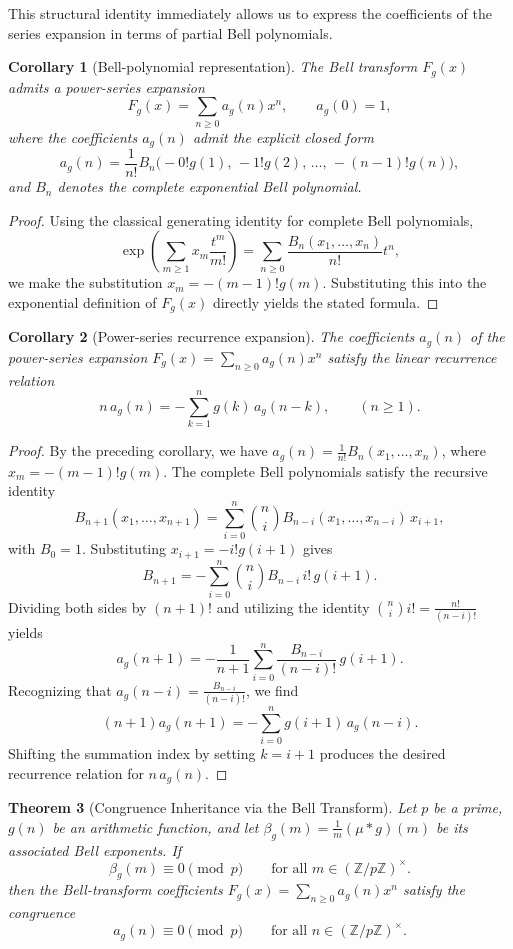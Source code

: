 \documentclass[11pt, a4paper]{article}
\newtheorem{theorem}{Theorem}[section]
\newtheorem{corollary}[theorem]{Corollary}
\theoremstyle{remark}
\begin{document}
This structural identity immediately allows us to express the coefficients of the series expansion in terms of partial Bell polynomials.

\begin{corollary}[Bell-polynomial representation]
The Bell transform \(F_g(x)\) admits a power-series expansion
\[
F_g(x)
=
\sum_{n\ge0}a_g(n)x^n,
\qquad a_g(0)=1,
\]
where the coefficients \(a_g(n)\) admit the explicit closed form
\[
a_g(n)
=
\frac1{n!}
B_n\!\bigl(
-0!g(1),\,
-1!g(2),\,
\dots,\,
-(n-1)!g(n)
\bigr),
\]
and \(B_n\) denotes the complete exponential Bell polynomial.
\end{corollary}

\begin{proof}
Using the classical generating identity for complete Bell polynomials,
\[
\exp\!\left(
\sum_{m\ge1}x_m\frac{t^m}{m!}
\right)
=
\sum_{n\ge0}\frac{B_n(x_1,\dots,x_n)}{n!}t^n,
\]
we make the substitution \(x_m=-(m-1)!g(m)\). Substituting this into the exponential definition of \(F_g(x)\) directly yields the stated formula.
\end{proof}



\begin{corollary}[Power-series recurrence expansion]
The coefficients \(a_g(n)\) of the power-series expansion \(F_g(x) = \sum_{n\ge0}a_g(n)x^n\) satisfy the linear recurrence relation
\[
n\,a_g(n)
=
-\sum_{k=1}^n g(k)\,a_g(n-k),
\qquad (n\ge1).
\]
\end{corollary}

\begin{proof}
By the preceding corollary, we have \( a_g(n) = \frac{1}{n!} B_n(x_1,\dots,x_n) \), where \(x_m=-(m-1)!g(m)\). The complete Bell polynomials satisfy the recursive identity\
\[
B_{n+1}(x_1,\dots,x_{n+1})
=
\sum_{i=0}^{n}
\binom{n}{i}
B_{n-i}(x_1,\dots,x_{n-i})\,x_{i+1},
\]
with \(B_0=1\). Substituting \(x_{i+1}=-i!g(i+1)\) gives
\[
B_{n+1}
=
-\sum_{i=0}^{n}
\binom{n}{i}
B_{n-i}\, i!\, g(i+1).
\]
Dividing both sides by \((n+1)!\) and utilizing the identity \(\binom{n}{i}i! = \frac{n!}{(n-i)!}\) yields
\[
a_g(n+1)
=
-\frac1{n+1}
\sum_{i=0}^{n}
\frac{B_{n-i}}{(n-i)!}\,
g(i+1).
\]
Recognizing that \(a_g(n-i)=\frac{B_{n-i}}{(n-i)!}\), we find
\[
(n+1)a_g(n+1)
=
-\sum_{i=0}^{n}
g(i+1)\,a_g(n-i).
\]
Shifting the summation index by setting \(k = i+1\) produces the desired recurrence relation for \(n\,a_g(n)\).
\end{proof}



\begin{theorem}[Congruence Inheritance via the Bell Transform] \label{thm:congruence}
Let \(p\) be a prime, \(g(n)\) be an arithmetic function, and let \(\beta_g(m) = \frac1m(\mu*g)(m)\) be its associated Bell exponents. If
\[
\beta_g(m)\equiv0\pmod p
\qquad
\text{for all } m\in(\mathbb Z/p\mathbb Z)^\times.
\]
then the Bell-transform coefficients \(F_g(x) = \sum_{n\ge0}a_g(n)x^n\) satisfy the congruence
\[
\boxed{
a_g(n)\equiv0\pmod p
\qquad \text{for all } n\in(\mathbb Z/p\mathbb Z)^\times.
}
\]
\end{theorem}
\end{document}
